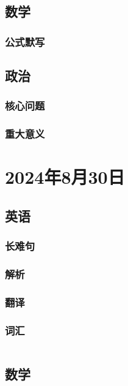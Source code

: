 \documentclass[UTF8]{ctexart}
\begin{document}
\subsection{数学}
\subsubsection{公式默写}
\begin{multicols}{2}
\end{multicols}
\subsection{政治}
\subsubsection{}
\subsubsection{核心问题}
\subsubsection{重大意义}
\section{2024年8月30日}
\subsection{英语}
\subsubsection{长难句}
\subsubsection{解析}
\subsubsection{翻译}
\subsubsection{词汇}
\begin{table}[h]
      \centering
      \begin{tabular}{p{}p{}}
      \end{tabular}
\end{table}
\subsection{数学}
\end{document}
